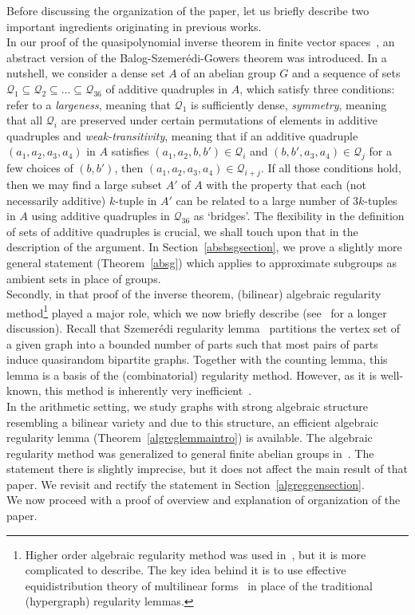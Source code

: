 \documentclass[a4paper,11pt]{article}
\numberwithin{theorem}{section}
\theoremstyle{definition}
\begin{document}
Before discussing the organization of the paper, let us briefly describe two important ingredients originating in previous works.\\

In our proof of the quasipolynomial inverse theorem in finite vector spaces~\cite{newU4}, an abstract version of the Balog-Szemer\'edi-Gowers theorem was introduced. In a nutshell, we consider a dense set $A$ of an abelian group $G$ and a sequence of sets $\mathcal{Q}_1 \subseteq \mathcal{Q}_2 \subseteq \dots \subseteq \mathcal{Q}_{36}$ of additive quadruples in $A$, which satisfy three conditions: refer to a \textit{largeness}, meaning that $\mathcal{Q}_1$ is sufficiently dense, \textit{symmetry}, meaning that all $\mathcal{Q}_i$ are preserved under certain permutations of elements in additive quadruples and \textit{weak-transitivity}, meaning that if an additive quadruple $(a_1, a_2, a_3, a_4)$ in $A$ satisfies $(a_1, a_2, b, b') \in \mathcal{Q}_i$ and $(b, b', a_3, a_4) \in \mathcal{Q}_j$ for a few choices of $(b, b')$, then $(a_1, a_2, a_3, a_4) \in \mathcal{Q}_{i+j}$. If all those conditions hold, then we may find a large subset $A'$ of $A$ with the property that each (not necessarily additive) $k$-tuple in $A'$ can be related to a large number of $3k$-tuples in $A$ using additive quadruples in $\mathcal{Q}_{36}$ as `bridges'. The flexibility in the definition of sets of additive quadruples is crucial, we shall touch upon that in the description of the argument. In Section~\ref{absbsgsection}, we prove a slightly more general statement (Theorem~\ref{absg}) which applies to approximate subgroups as ambient sets in place of groups.\\
\indent Secondly, in that proof of the inverse theorem, (bilinear) algebraic regularity method\footnote{Higher order algebraic regularity method was used in~\cite{FMulti}, but it is more complicated to describe. The key idea behind it is to use effective equidistribution theory of multilinear forms~\cite{BhowLov, GreenTaoPolys, Janzer2, LukaRank, MoshZhu} in place of the traditional (hypergraph) regularity lemmas.} played a major role, which we now briefly describe (see~\cite{newU4} for a longer discussion). Recall that Szemerédi regularity lemma~\cite{SzemAP, SzemReg} partitions the vertex set of a given graph into a bounded number of parts such that most pairs of parts induce quasirandom bipartite graphs. Together with the counting lemma, this lemma is a basis of the (combinatorial) regularity method. However, as it is well-known, this method is inherently very inefficient~\cite{TimRegConstruction}.\\
\indent In the arithmetic setting, we study graphs with strong algebraic structure resembling a bilinear variety and due to this structure, an efficient algebraic regularity lemma (Theorem~\ref{algreglemmaintro}) is available. The  algebraic regularity method was generalized to general finite abelian groups in~\cite{generalBilBog}. The statement there is slightly imprecise, but it does not affect the main result of that paper. We revisit and rectify the statement in Section~\ref{algreggensection}.\\
\indent We now proceed with a proof of overview and explanation of organization of the paper.\\
\end{document}

